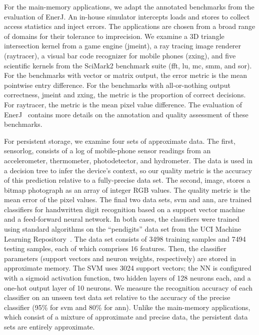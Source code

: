 For the main-memory applications, we adapt the annotated benchmarks
from the evaluation of EnerJ. An in-house simulator intercepts
loads and stores to collect access statistics and inject errors. The
applications are chosen from a broad range of domains for their tolerance to
imprecision. We examine a 3D triangle intersection kernel from a game engine
(\textsf{jmeint}), a ray tracing image renderer (\textsf{raytracer}), a visual
bar code recognizer for mobile phones (\textsf{zxing}), and five scientific
kernels from the SciMark2 benchmark suite (\textsf{fft}, \textsf{lu},
\textsf{mc}, \textsf{smm}, and \textsf{sor}).
For the benchmarks with vector or matrix
output, the error metric is the mean pointwise entry difference. For the
benchmarks with all-or-nothing output correctness, \textsf{jmeint} and
\textsf{zxing}, the metric is the proportion of correct decisions. For
\textsf{raytracer}, the metric is the mean pixel value difference.
The evaluation of EnerJ~\cite{enerj}
contains more details on the annotation and quality assessment of these
benchmarks.

For persistent storage, we examine four sets of approximate data. The first,
\textsf{sensorlog}, consists of a log of mobile-phone sensor readings from an
accelerometer, thermometer, photodetector, and hydrometer. The data is used in
a decision tree to infer the device's context, so our quality metric is the
accuracy of this prediction relative to a fully-precise data set.
The second, \textsf{image}, stores
a bitmap photograph as an array of integer RGB values. The quality metric is
the mean error of the pixel values.
The final two data sets, \textsf{svm} and \textsf{ann}, are trained
classifiers for handwritten digit recognition based on a support vector
machine and a feed-forward neural network. In both cases,
the classifiers were trained using standard algorithms on the ``pendigits''
data set from the UCI Machine Learning Repository~\cite{ucimlrepo}.
The data set consists of 3498 training samples and 7494 testing samples, each
of which comprises 16 features.
Then, the classifier
parameters (support vectors and neuron weights, respectively) are stored in
approximate memory.
The SVM uses 3024 support vectors; the NN is configured with a sigmoid
activation function, two hidden layers
of 128 neurons each, and a one-hot output layer of 10 neurons.
We measure the recognition accuracy of each classifier on
an unseen test data set relative to the accuracy of the precise classifier
(95\% for \textsf{svm} and 80\% for \textsf{ann}).
Unlike the main-memory applications, which consist of a mixture
of approximate and precise data,
the persistent data sets are entirely
approximate.

